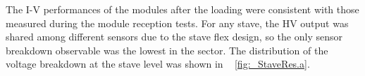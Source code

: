The I-V performances of the modules after the loading were consistent with those measured during the module reception tests. For any stave, the HV output was shared among different sensors due to the stave flex design, so the only sensor breakdown observable was the lowest in the sector. The distribution of the voltage breakdown at the stave level was shown in ~ \ref{fig:_StaveRes.a}.
